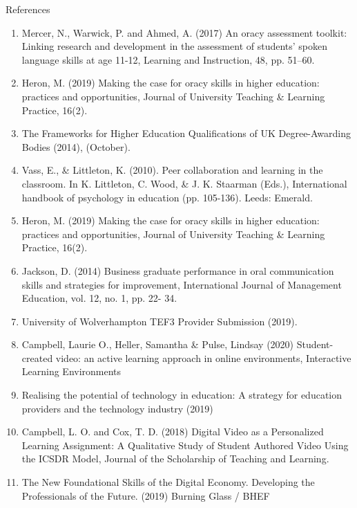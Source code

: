 \documentclass[final]{beamer}
\newlength{\onecolwid}
\begin{document}
\begin{frame}[t]
\begin{columns}[t]
\begin{column}{\onecolwid}
\begin{block}{References}
\tiny	
	\begin{enumerate}
		\item Mercer, N., Warwick, P. and Ahmed, A. (2017) An oracy assessment toolkit: Linking research and development in the assessment of students’ spoken language skills at age 11-12, Learning and Instruction, 48, pp. 51–60.
		\item Heron, M. (2019) Making the case for oracy skills in higher education: practices and opportunities, Journal of University Teaching \& Learning Practice, 16(2).
		\item The Frameworks for Higher Education Qualifications of UK Degree-Awarding Bodies (2014), (October).
		\item Vass, E., \& Littleton, K. (2010). Peer collaboration and learning in the classroom. In K. Littleton, C. Wood, \& J. K. Staarman (Eds.), International handbook of psychology in education (pp. 105-136). Leeds: Emerald.
		\item Heron, M. (2019) Making the case for oracy skills in higher education: practices and opportunities, Journal of University Teaching \& Learning Practice, 16(2).
		\item Jackson, D. (2014) Business graduate performance in oral communication skills and strategies for improvement, International Journal of Management Education, vol. 12, no. 1, pp. 22- 34.
		\item University of Wolverhampton TEF3 Provider Submission (2019).
		\item Campbell, Laurie O., Heller, Samantha \& Pulse, Lindsay (2020) Student-created video: an active learning approach in online environments, Interactive Learning Environments
		\item Realising the potential of technology in education: A strategy for education providers and the technology industry (2019)
		\item Campbell, L. O. and Cox, T. D. (2018) Digital Video as a Personalized Learning Assignment: A Qualitative Study of Student Authored Video Using the ICSDR Model, Journal of the Scholarship of Teaching and Learning.
		\item The New Foundational Skills of the Digital Economy. Developing the Professionals of the Future. (2019) Burning Glass / BHEF
		
	\end{enumerate}
	
\end{block}


\end{column}
\end{columns}
\end{frame}
\end{document}
